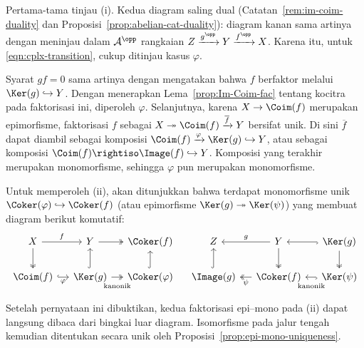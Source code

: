 \begin{bukti}
	Pertama-tama tinjau (i). Kedua diagram saling dual
	(Catatan~\ref{rem:im-coim-duality} dan
	Proposisi~\ref{prop:abelian-cat-duality}): diagram kanan sama artinya dengan
	meninjau dalam $\mathcal{A}^{\opp}$ rangkaian
	$Z \xrightarrow{g^{\opp}} Y \xrightarrow{f^{\opp}} X$. Karena itu, untuk
	\eqref{eqn:cplx-transition}, cukup ditinjau kasus $\varphi$.

	Syarat $gf=0$ sama artinya dengan mengatakan bahwa $f$ berfaktor melalui
	$\Ker(g) \hookrightarrow Y$. Dengan menerapkan
	Lema~\ref{prop:Im-Coim-fac} tentang kocitra pada faktorisasi ini, diperoleh
	$\varphi$. Selanjutnya, karena $X \to \Coim(f)$ merupakan epimorfisme,
	faktorisasi $f$ sebagai
	$X \twoheadrightarrow \Coim(f) \xrightarrow{\overline{f}} Y$ bersifat unik.
	Di sini $\overline{f}$ dapat diambil sebagai komposisi
	$\Coim(f) \xrightarrow{\varphi} \Ker(g) \hookrightarrow Y$, atau sebagai
	komposisi $\Coim(f) \rightiso \Image(f) \hookrightarrow Y$. Komposisi yang
	terakhir merupakan monomorfisme, sehingga $\varphi$ pun merupakan
	monomorfisme.

	Untuk memperoleh (ii), akan ditunjukkan bahwa terdapat monomorfisme unik
	$\Coker(\varphi) \hookrightarrow \Coker(f)$
	(atau epimorfisme $\Ker(g) \twoheadrightarrow \Ker(\psi)$) yang membuat
	diagram berikut komutatif:
	\[
	\begin{tikzcd}[column sep=small]
		X \arrow[r, "f"] \arrow[twoheadrightarrow, d] & Y \arrow[twoheadrightarrow, r] & \Coker(f) \\
		\Coim(f) \arrow[hookrightarrow, r, "\varphi"'] & \Ker(g) \arrow[twoheadrightarrow, r, "\text{kanonik}"' inner sep=0.6em] \arrow[hookrightarrow, u] & \Coker(\varphi) \arrow[hookrightarrow, u]
	\end{tikzcd} \quad
	\begin{tikzcd}[column sep=small]
		Z & Y \arrow[twoheadrightarrow, d] \arrow[l, "g"'] & \Ker(g) \arrow[twoheadrightarrow, d] \arrow[hookrightarrow, l] \\
		\Image(g) \arrow[hookrightarrow, u] & \Coker(f) \arrow[twoheadrightarrow, l, "\psi"] & \Ker(\psi) \arrow[hookrightarrow, l, "\text{kanonik}" inner sep=0.6em]
	\end{tikzcd}
	\]
	Setelah pernyataan ini dibuktikan, kedua faktorisasi epi--mono pada (ii)
	dapat langsung dibaca dari bingkai luar diagram. Isomorfisme pada jalur
	tengah kemudian ditentukan secara unik oleh
	Proposisi~\ref{prop:epi-mono-uniqueness}.


\end{bukti}
